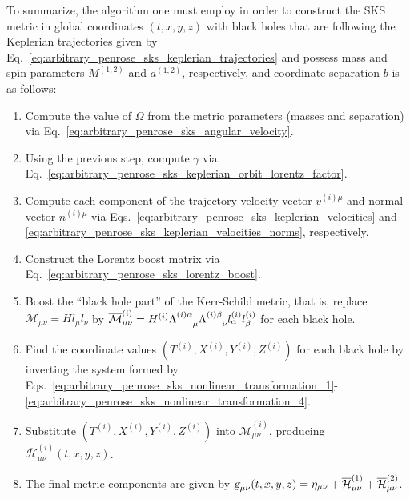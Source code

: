 To summarize, the algorithm one must employ in order to construct the SKS metric in global coordinates $(t,x,y,z)$ with black holes that are following the Keplerian trajectories given by Eq.~\eqref{eq:arbitrary_penrose_sks_keplerian_trajectories} and possess mass and spin parameters $M^{(1,2)}$ and $a^{(1,2)}$, respectively, and coordinate separation $b$ is as follows:
%
\begin{enumerate}
  \item Compute the value of $\Omega$ from the metric parameters (masses and separation) via Eq.~\eqref{eq:arbitrary_penrose_sks_angular_velocity}.
  \item Using the previous step, compute $\gamma$ via Eq.~\eqref{eq:arbitrary_penrose_sks_keplerian_orbit_lorentz_factor}.
  \item Compute each component of the trajectory velocity vector $v^{(i) \mu}$ and normal vector $n^{(i) \mu}$ via Eqs.~\eqref{eq:arbitrary_penrose_sks_keplerian_velocities} and \eqref{eq:arbitrary_penrose_sks_keplerian_velocities_norms}, respectively.
  \item Construct the Lorentz boost matrix via Eq.~\eqref{eq:arbitrary_penrose_sks_lorentz_boost}.
  \item Boost the ``black hole part'' of the Kerr-Schild metric, that is, replace  $\mathcal{M}_{\mu\nu} = H l_\mu l_\nu$ by $\overline{\mathcal{M}}^{(i)}_{\mu\nu} = H^{(i)} \tens{\Lambda}{(i) \alpha}{\mu} \tens{\Lambda}{(i) \beta}{\nu} l^{(i)}_\alpha l^{(i)}_\beta$ for each black hole.
  \item Find the coordinate values $(T^{(i)}, X^{(i)}, Y^{(i)}, Z^{(i)})$ for each black hole by inverting the system formed by Eqs.~\eqref{eq:arbitrary_penrose_sks_nonlinear_transformation_1}-\eqref{eq:arbitrary_penrose_sks_nonlinear_transformation_4}.
  \item Substitute $(T^{(i)}, X^{(i)}, Y^{(i)}, Z^{(i)})$ into $\overline{\mathcal{M}}^{(i)}_{\mu\nu}$, producing $\overline{\mathcal{H}}^{(i)}_{\mu\nu}(t,x,y,z)$.
  \item The final metric components are given by $\mtrtens{\mu}{\nu}(t,x,y,z) = \eta_{\mu\nu} + \overline{\mathcal{H}}^{(1)}_{\mu\nu} + \overline{\mathcal{H}}^{(2)}_{\mu\nu}$.
\end{enumerate}

